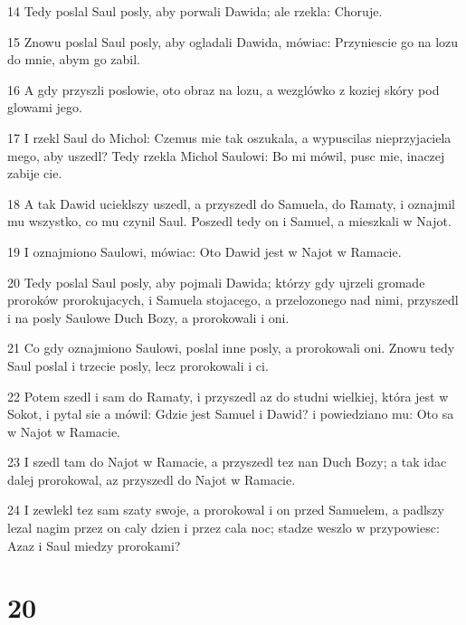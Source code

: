 \par 14 Tedy poslal Saul posly, aby porwali Dawida; ale rzekla: Choruje.
\par 15 Znowu poslal Saul posly, aby ogladali Dawida, mówiac: Przyniescie go na lozu do mnie, abym go zabil.
\par 16 A gdy przyszli poslowie, oto obraz na lozu, a wezglówko z koziej skóry pod glowami jego.
\par 17 I rzekl Saul do Michol: Czemus mie tak oszukala, a wypuscilas nieprzyjaciela mego, aby uszedl? Tedy rzekla Michol Saulowi: Bo mi mówil, pusc mie, inaczej zabije cie.
\par 18 A tak Dawid ucieklszy uszedl, a przyszedl do Samuela, do Ramaty, i oznajmil mu wszystko, co mu czynil Saul. Poszedl tedy on i Samuel, a mieszkali w Najot.
\par 19 I oznajmiono Saulowi, mówiac: Oto Dawid jest w Najot w Ramacie.
\par 20 Tedy poslal Saul posly, aby pojmali Dawida; którzy gdy ujrzeli gromade proroków prorokujacych, i Samuela stojacego, a przelozonego nad nimi, przyszedl i na posly Saulowe Duch Bozy, a prorokowali i oni.
\par 21 Co gdy oznajmiono Saulowi, poslal inne posly, a prorokowali oni. Znowu tedy Saul poslal i trzecie posly, lecz prorokowali i ci.
\par 22 Potem szedl i sam do Ramaty, i przyszedl az do studni wielkiej, która jest w Sokot, i pytal sie a mówil: Gdzie jest Samuel i Dawid? i powiedziano mu: Oto sa w Najot w Ramacie.
\par 23 I szedl tam do Najot w Ramacie, a przyszedl tez nan Duch Bozy; a tak idac dalej prorokowal, az przyszedl do Najot w Ramacie.
\par 24 I zewlekl tez sam szaty swoje, a prorokowal i on przed Samuelem, a padlszy lezal nagim przez on caly dzien i przez cala noc; stadze weszlo w przypowiesc: Azaz i Saul miedzy prorokami?

\chapter{20}

